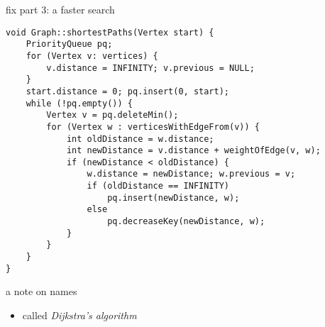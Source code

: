 \begin{frame}[fragile,label=withPQ]{fix part 3: a faster search}
\vspace{-.5cm}
\begin{lstlisting}
void Graph::shortestPaths(Vertex start) {
    PriorityQueue pq;
    for (Vertex v: vertices) {
        v.distance = INFINITY; v.previous = NULL;
    }
    start.distance = 0; pq.insert(0, start);
    while (!pq.empty()) {
        Vertex v = pq.deleteMin();
        for (Vertex w : verticesWithEdgeFrom(v)) {
            int oldDistance = w.distance;
            int newDistance = v.distance + weightOfEdge(v, w);
            if (newDistance < oldDistance) {
                w.distance = newDistance; w.previous = v;
                if (oldDistance == INFINITY)
                    pq.insert(newDistance, w);
                else
                    pq.decreaseKey(newDistance, w);
            } 
        }
    }
}
\end{lstlisting}
\end{frame}

\begin{frame}{a note on names}
\begin{itemize}
\item called \textit{Dijkstra's algorithm}
\end{itemize}
\end{frame}
